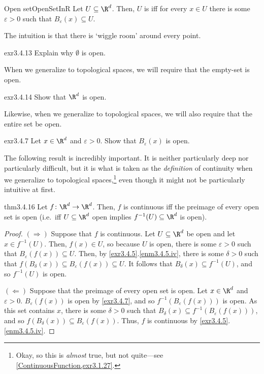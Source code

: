 \begin{dfn}{Open set}{OpenSetInR}
Let $U\subseteq \R ^d$.  Then, $U$ is  iff for every $x\in U$ there is some $\varepsilon >0$ such that $B_\varepsilon (x)\subseteq U$.
\begin{rmk}
The intuition is that there is `wiggle room' around every point.
\end{rmk}
\end{dfn}
\begin{exr}{}{exr3.4.13}
Explain why $\emptyset$ is open.
\begin{rmk}
When we generalize to topological spaces, we will require that the empty-set is open.
\end{rmk}
\end{exr}
\begin{exr}{}{exr3.4.14}
Show that $\R ^d$ is open.
\begin{rmk}
Likewise, when we generalize to topological spaces, we will also require that the entire set be open.
\end{rmk}
\end{exr}
\begin{exr}{}{exr3.4.7}
Let $x\in \R ^d$ and $\varepsilon >0$.  Show that $B_\varepsilon (x)$ is open.
\end{exr}
The following result is incredibly important.  It is neither particularly deep nor particularly difficult, but it is what is taken as the \emph{definition} of continuity when we generalize to topological spaces,\footnote{Okay, so this is \emph{almost} true, but not quite---see \cref{ContinuousFunction,exr3.1.27}.} even though it might not be particularly intuitive at first.
\begin{thm}{}{thm3.4.16}
Let $f\colon \R ^d \rightarrow \R ^d$.  Then, $f$ is continuous iff the preimage of every open set is open (i.e.~iff $U\subseteq \R ^d$ open implies $f^{-1}(U)\subseteq \R ^d$ is open).
\begin{proof}
$(\Rightarrow )$ Suppose that $f$ is continuous.  Let $U\subseteq \R ^d$ be open and let $x\in f^{-1}(U)$.  Then, $f(x)\in U$, so because $U$ is open, there is some $\varepsilon >0$ such that $B_\varepsilon (f(x))\subseteq U$.  Then, by \cref{exr3.4.5}.\cref{enm3.4.5.iv}, there is some $\delta >0$ such that $f(B_\delta (x))\subseteq B_\varepsilon (f(x))\subseteq U$.  It follows that $B_\delta (x)\subseteq f^{-1}(U)$, and so $f^{-1}(U)$ is open.

\blankline
\noindent
$(\Leftarrow )$ Suppose that the preimage of every open set is open.  Let $x\in \R ^d$ and $\varepsilon >0$.  $B_\varepsilon (f(x))$ is open by \cref{exr3.4.7}, and so $f^{-1}(B_\varepsilon (f(x)))$ is open.  As this set contains $x$, there is some $\delta >0$ such that $B_\delta (x)\subseteq f^{-1}(B_\varepsilon (f(x)))$, and so $f(B_\delta (x))\subseteq B_\varepsilon (f(x))$.  Thus, $f$ is continuous by \cref{exr3.4.5}.\cref{enm3.4.5.iv}.
\end{proof}
\end{thm}

